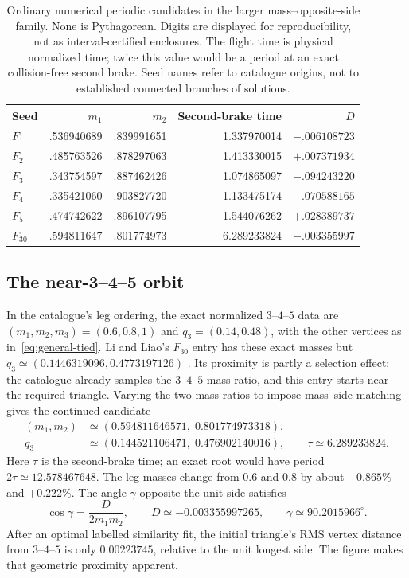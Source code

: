 \begin{table}[htbp]
\centering
\small
\begin{tabular}{lrrrr}
\toprule
Seed & $m_1$ & $m_2$ & Second-brake time & $D$\\
\midrule
$F_1$ & .536940689 & .839991651 & 1.337970014 & $-.006108723$\\
$F_2$ & .485763526 & .878297063 & 1.413330015 & $+.007371934$\\
$F_3$ & .343754597 & .887462426 & 1.074865097 & $-.094243220$\\
$F_4$ & .335421060 & .903827720 & 1.133475174 & $-.070588165$\\
$F_5$ & .474742622 & .896107795 & 1.544076262 & $+.028389737$\\
$F_{30}$ & .594811647 & .801774973 & 6.289233824 & $-.003355997$\\
\bottomrule
\end{tabular}
\caption{Ordinary numerical periodic candidates in the larger
mass--opposite-side family. None is Pythagorean. Digits are displayed for
reproducibility, not as interval-certified enclosures. The flight time is
physical normalized time; twice this value would be a period at an exact
collision-free second brake. Seed names refer to catalogue origins, not
to established connected branches of solutions.}
\label{tab:candidates}
\end{table}

\subsection{The near-3--4--5 orbit}

In the catalogue's leg ordering, the exact normalized $3$--$4$--$5$ data
are $(m_1,m_2,m_3)=(0.6,0.8,1)$ and $q_3=(0.14,0.48)$, with the other
vertices as in~\eqref{eq:general-tied}. Li and Liao's $F_{30}$ entry has
these exact masses but $q_3\simeq(0.1446319096,0.4773197126)$
\cite{LiLiao}. Its proximity is partly a selection effect: the catalogue
already samples the $3$--$4$--$5$ mass ratio, and this entry starts near
the required triangle. Varying the two mass ratios to impose mass--side
matching gives the continued candidate
\begin{equation}\label{eq:f30-candidate}
 \begin{split}
 (m_1,m_2)&\simeq(0.594811646571,\;0.801774973318),\\
 q_3&\simeq(0.144521106471,\;0.476902140016),\qquad
 \tau\simeq6.289233824.
 \end{split}
\end{equation}
Here $\tau$ is the second-brake time; an exact root would have period
$2\tau\simeq12.578467648$. The leg masses change from $0.6$ and $0.8$
by about $-0.865\%$ and $+0.222\%$. The angle $\gamma$ opposite the unit
side satisfies
\[
 \cos\gamma=\frac{D}{2m_1m_2},\qquad
 D\simeq-0.003355997265,\qquad \gamma\simeq90.2015966^\circ.
\]
After an optimal labelled similarity fit, the initial triangle's RMS
vertex distance from $3$--$4$--$5$ is only $0.00223745$, relative to the
unit longest side. The figure makes that geometric proximity apparent.

